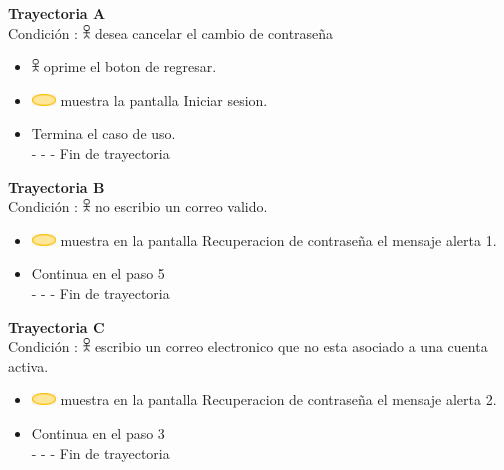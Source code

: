 \textbf{Trayectoria A}\\
Condición : \includegraphics[width=0.0150\textwidth]{Figuras/persona.png} desea cancelar el cambio de contraseña
\begin{itemize}
    \item \includegraphics[width=0.0150\textwidth]{Figuras/persona.png} oprime el boton de regresar.
     \item \includegraphics[width=0.0500\textwidth]{Figuras/sistema.png} muestra la pantalla Iniciar sesion.
    \item Termina el caso de uso.\\
    - - - Fin de trayectoria
\end{itemize}
\textbf{Trayectoria B}\\
Condición :  \includegraphics[width=0.0150\textwidth]{Figuras/persona.png} no escribio un correo valido.
\begin{itemize}
    \item \includegraphics[width=0.0500\textwidth]{Figuras/sistema.png} muestra en la pantalla Recuperacion de contraseña el mensaje alerta 1.
    \item Continua en el paso 5\\
    - - - Fin de trayectoria
\end{itemize}
\textbf{Trayectoria C}\\
Condición : \includegraphics[width=0.0150\textwidth]{Figuras/persona.png} escribio un correo electronico que no esta asociado a una cuenta activa.
\begin{itemize}
    \item \includegraphics[width=0.0500\textwidth]{Figuras/sistema.png} muestra en la pantalla Recuperacion de contraseña el mensaje alerta 2.
    \item Continua en el paso 3\\
    - - - Fin de trayectoria
\end{itemize}

